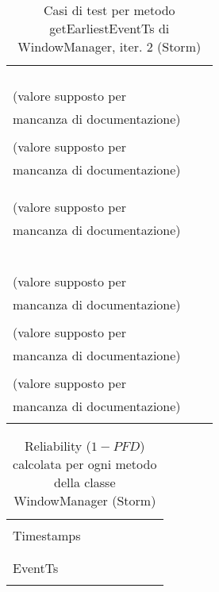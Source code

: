 \documentclass[10pt, a4paper]{article}
\newcommand{\Intmaketable}[4]{
	\begin{longtable}{#3}
	#4
	\caption{#2}
	\label{#1}
	\end{longtable}
}
\newcommand{\Inttestctable}[3]{
	\Intmaketable{#1}{#2}{|l|l|l|}{
	\hline
	\thead{Input} & \thead{Esito atteso} & \thead{Motivazione}\\
	\hline
	\hline
	#3
	\hline}
}
\newcommand{\Intreltable}[3]{
	\Intmaketable{#1}{#2}{|l|l|l|l|l|l|l|}{
	\hline
	\thead{Metodo} & \thead{\# test totali} & \thead{\# test pass.} & \thead{\# test fail.} & \thead{Prof. op.} &
	\thead{Distribuzione} & \thead{Reliability}\\
	\hline
	\hline
	#3
	\hline}
}
\newcommand{\Inttestccaption}[4]{Casi di test per metodo #1 di #2, iter. #3 (#4)}
\newcommand{\Intrelcaption}[2]{Reliability ($1-PFD$) calcolata per ogni metodo della classe #1 (#2)}
\newcommand{\gettablelabel}[5]{table:#1:#2:#3:iter#4:proj#5}
\newcommand{\getreltablelabel}[2]{\gettablelabel{#1}{}{}{}{#2}}
\newcommand{\testctable}[5]{
	\Inttestctable{\gettablelabel{testc}{#1}{#2}{#3}{#4}}
		{\Inttestccaption{#1}{#2}{#3}{#4}}
		{#5}
}
\newcommand{\reltable}[3] {
	\Intreltable{\getreltablelabel{#1}{#2}}
		{\Intrelcaption{#1}{#2}}
		{#3}
}
\newcommand{\unifdist}[1]{Uniforme: $#1$}
\newcommand{\tcell}{\makecell[tl]}
\newcommand{\newtrow}{\\ \hline}
\def\storm{Storm}
\begin{document}
	\testctable{getEarliestEventTs}{WindowManager}{2}{\storm}{
			\tcell{$-1,-1$} &
			\tcell{IllegalArgumentException viene lanciata} &
			\tcell{startTs < 0 e endTs < 0}
		\newtrow
			\tcell{$-1,0$} &
			\tcell{IllegalArgumentException viene lanciata} &
			\tcell{startTs < 0}
		\newtrow
			\tcell{$-1,-2$} &
			\tcell{IllegalArgumentException viene lanciata} &
			\tcell{startTs < 0 e endTs < 0}
		\newtrow
			\tcell{$0,0$} &
			\tcell{Ritorno $-1$} &
			\tcell{Nessun evento nel range\\(valore supposto per\\ mancanza di documentazione)}
		\newtrow
			\tcell{$0,1$} &
			\tcell{Ritorno $-1$} &
			\tcell{Nessun evento nel range\\(valore supposto per\\ mancanza di documentazione)}
		\newtrow
			\tcell{$0,-1$} &
			\tcell{IllegalArgumentException viene lanciata} &
			\tcell{endTs < 0}
		\newtrow
			\tcell{$t(e_1)-100, t(e_2)$} &
			\tcell{Ritorno $t(e_1)$} &
			\tcell{}
		\newtrow
			\tcell{$t(e_1), t(e_1)+100$} &
			\tcell{Ritorno $-1$} &
			\tcell{Nessun evento nel range\\(valore supposto per\\ mancanza di documentazione)}
		\newtrow
			\tcell{$t(e_1), t(e_2)$} &
			\tcell{Ritorno $t(e_2)$} &
			\tcell{}
		\newtrow
			\tcell{$t(e_1), t(e_3)$} &
			\tcell{Ritorno $t(e_2)$} &
			\tcell{}
		\newtrow
			\tcell{$t(e_2), t(e_7)$} &
			\tcell{Ritorno $t(e_3)$} &
			\tcell{}
		\newtrow
			\tcell{$t(e_{10})-100, t(e_{10})+100$} &
			\tcell{Ritorno $t(e_{10})$} &
			\tcell{}
		\newtrow
			\tcell{$t(e_1)-100, t(e_{10})+100$} &
			\tcell{Ritorno $t(e_1)$} &
			\tcell{}
		\newtrow
			\tcell{$t(e_{10}), t(e_{10})+100$} &
			\tcell{Ritorno $-1$} &
			\tcell{Nessun evento nel range\\(valore supposto per\\ mancanza di documentazione)}
		\newtrow
			\tcell{$t(e_1)-200, t(e_1)-100$} &
			\tcell{Ritorno $-1$} &
			\tcell{Nessun evento nel range\\(valore supposto per\\ mancanza di documentazione)}
		\newtrow
			\tcell{$t(e_{10})+100, t(e_{10})+200$} &
			\tcell{Ritorno $-1$} &
			\tcell{Nessun evento nel range\\(valore supposto per\\ mancanza di documentazione)}
		\newtrow
	}
	
	\reltable{WindowManager}{\storm}{
			\tcell{getSlidingCount\\Timestamps} &
			\tcell{$30$} &
			\tcell{$14$} &
			\tcell{$16$} & 
			\tcell{
				tabella $\ref{\gettablelabel{testc}{getSlidingCountTimestamps}{WindowManager}{1}{\storm}}$} &
			\tcell{\unifdist{0.033}} &
			\tcell{$0.472$}
		\newtrow	
			\tcell{getEventCount} &
			\tcell{$7$} &
			\tcell{$6$} &
			\tcell{$1$} &
			\tcell{
				tabella $\ref{\gettablelabel{testc}{getEventCount}{WindowManager}{1}{\storm}}$} &
			\tcell{\unifdist{0.143}} &
			\tcell{$0.857$}
		\newtrow
			\tcell{getEarliest\\EventTs} &
			\tcell{$16$} &
			\tcell{$6$} &
			\tcell{$10$} &
			\tcell{
				tabella $\ref{\gettablelabel{testc}{getEarliestEventTs}{WindowManager}{2}{\storm}}$} &
			\tcell{\unifdist{0.062}} &
			\tcell{$0.38$}
		\newtrow
	}
	
\end{document}
